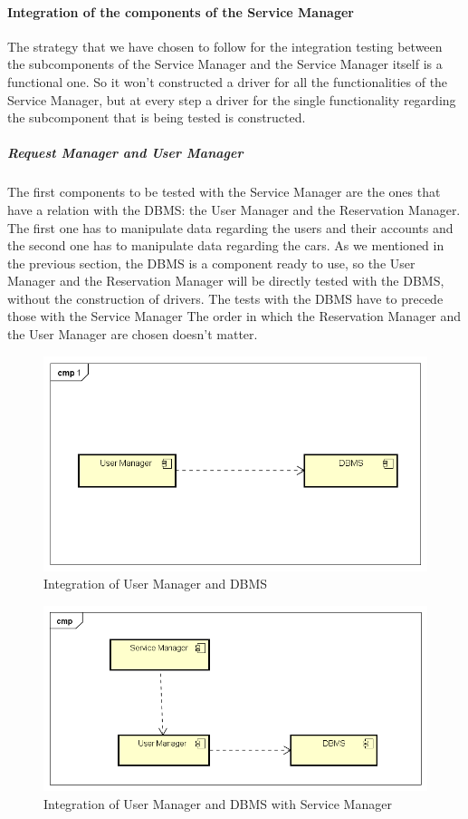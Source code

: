 \paragraph{Integration of the components of the Service Manager}
The strategy that we have chosen to follow for the integration testing between the subcomponents of the Service Manager and the Service Manager itself is a functional one. So it won't constructed a driver for all the functionalities of the Service Manager, but at every step a driver for the single functionality regarding the subcomponent that is being tested is constructed.
\subparagraph{Request Manager and User Manager}
The first components to be tested with the Service Manager are the ones that have a relation with the DBMS: the User Manager and the Reservation Manager. The first one has to manipulate data regarding the users and their accounts and the second one has to manipulate data regarding the cars. As we mentioned in the previous section, the DBMS is a component ready to use, so the User Manager and the Reservation Manager will be directly tested with the DBMS, without the construction of drivers. The tests with the DBMS have to precede those with the Service Manager \newline
The order in which the Reservation Manager and the User Manager are chosen doesn't matter. 

\begin{figure}[H]	
	\centering
	\includegraphics[width=\textwidth]{img/UserMan_DBMS_int}
	\caption{Integration of User Manager and DBMS}
\end{figure}

\begin{figure}[H]	
	\centering
	\includegraphics[width=\textwidth]{img/UserMan_SrvMan_int}
	\caption{Integration of User Manager and DBMS with Service Manager}
\end{figure}

